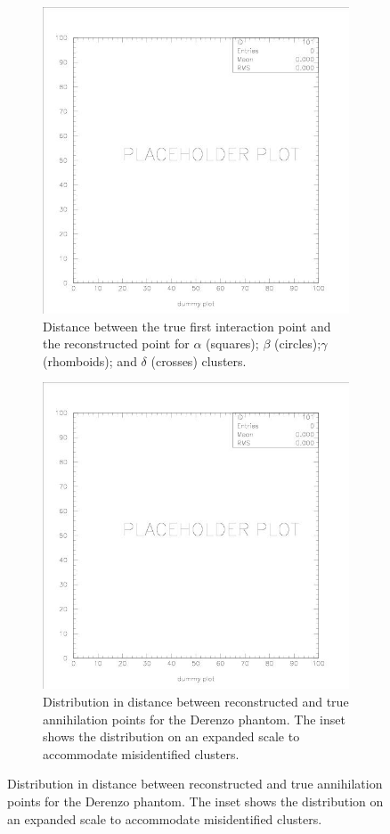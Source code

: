 \documentclass[12pt]{article}
\begin{document}
\begin{figure}[p]
       \begin{subfigure}{0.495\textwidth}
            \centering
                \includegraphics[width=0.6\linewidth]{Figures/dummy.jpg}
                \caption{Distance between the true first interaction point and the reconstructed point for $\alpha$ (squares);
                $\beta$ (circles);$\gamma$ (rhomboids); and $\delta $ (crosses) clusters.}
                \label{fig:cf_5th_plot}
        \end{subfigure}
        \hfil
        \begin{subfigure}{0.495\textwidth}
            \centering
                \includegraphics[width=0.6\linewidth]{Figures/dummy.jpg}
                \caption{Distribution in distance between reconstructed and true annihilation points for the Derenzo phantom. The inset shows the distribution on an expanded scale to accommodate misidentified clusters.}
                \label{fig:cf_6th_plot}
        \end{subfigure}


\end{figure}
\end{document}
